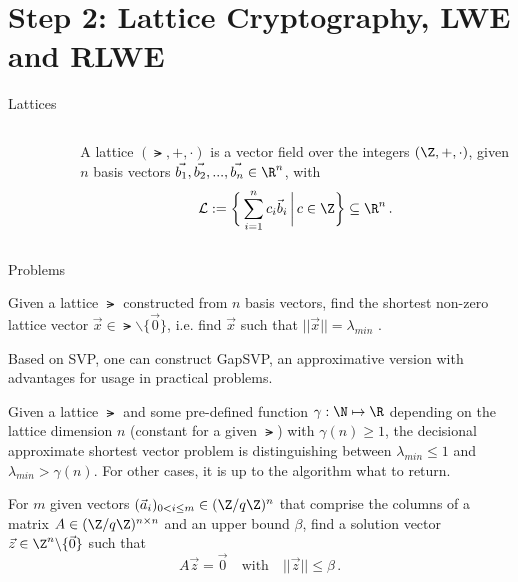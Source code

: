 \section{Step 2: Lattice Cryptography, LWE and RLWE}
\begin{frame}[c]{Lattices}
  \begin{columns}
    \begin{column}{0.32\linewidth}
      \begin{figure}
        \centering
        \label{fig:lattice}
      \end{figure}
    \end{column}
    \begin{column}{0.6\linewidth}
      \begin{definition}[Lattice]
        A lattice $(\lat, +, \cdot)$ is a vector field over the integers $(\Z, +, \cdot)$, given $n$ basis vectors $\vec{b_1}, \vec{b_2}, ..., \vec{b_n} \in \R^n$, with
        $$\lat := \bigg\{\sum_{i=1}^n c_i \vec{b}_i \,\bigg|\, c \in \Z\bigg\} \subseteq \R^n \,.$$
      \end{definition}
    \end{column}
  \end{columns}
\end{frame}

\begin{frame}[allowframebreaks]{Problems}
  \begin{definition}
    Given a lattice $\lat$ constructed from $n$ basis vectors, find the shortest non-zero lattice vector $\vec{x} \in \lat \backslash \{\vec{0}\}$, i.e. find $\vec{x}$ such that $||\vec{x}|| = \lambda_{min}$ \parencite{2016-decade-of-lattice}.
  \end{definition}

  Based on SVP, one can construct GapSVP, an approximative version with advantages for usage in practical problems.

  \begin{definition}
    Given a lattice $\lat$ and some pre-defined function $\gamma: \N \mapsto \R$ depending on the lattice dimension $n$ (constant for a given $\lat$) with $\gamma(n) \geq 1$, the decisional approximate shortest vector problem is distinguishing between $\lambda_{min} \leq 1$ and $\lambda_{min} > \gamma(n)$.
    For other cases, it is up to the algorithm what to return.
  \end{definition}

  \begin{definition}
    For $m$ given vectors $(\vec{a}_i)_{0 < i \leq m} \in (\Z / q\Z)^n$ that comprise the columns of a matrix
    $A \in (\Z / q\Z)^{n \times n}$ and an upper bound $\beta$, find
    a solution vector $\vec{z} \in \Z^n \backslash \{\vec{0}\}$ such that
    $$A \vec{z} = \vec{0} \quad \mathrm{with} \quad ||\vec{z}|| \leq \beta\,.$$
  \end{definition}
\end{frame}

